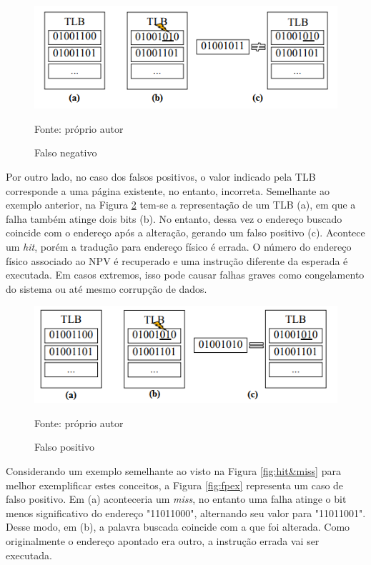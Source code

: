 \begin{figure}[ht]
\centering
\includegraphics[scale=0.82]{figuras/FN_.PNG}
\caption{Falso negativo}{Fonte: próprio autor}
\label{fig:fneg}
\end{figure}

Por outro lado, no caso dos falsos positivos, o valor indicado pela TLB corresponde a uma página existente, no entanto, incorreta. Semelhante ao exemplo anterior, na Figura \ref{fig:fpos} tem-se a representação de um TLB (a), em que a falha também atinge dois bits (b). No entanto, dessa vez o endereço buscado coincide com o endereço após a alteração, gerando um falso positivo (c). Acontece um \textit{hit}, porém a tradução para endereço físico é errada. O número do endereço físico associado ao NPV é recuperado e uma instrução diferente da esperada é executada. Em casos extremos, isso pode causar falhas graves como congelamento do sistema ou até mesmo corrupção de dados. 

\begin{figure}[ht]
\centering
\includegraphics[scale=0.8]{figuras/FP_.PNG}
\caption{Falso positivo}{Fonte: próprio autor}
\label{fig:fpos}
\end{figure}

Considerando um exemplo semelhante ao visto na Figura \ref{fig:hit&miss} para melhor exemplificar estes conceitos, a Figura \ref{fig:fpex} representa um caso de falso positivo. Em (a) aconteceria um \textit{miss}, no entanto uma falha atinge o bit menos significativo do endereço "11011000", alternando seu valor para "11011001". Desse modo, em (b), a palavra buscada coincide com a que foi alterada. Como originalmente o endereço apontado era outro, a instrução errada vai ser executada.

